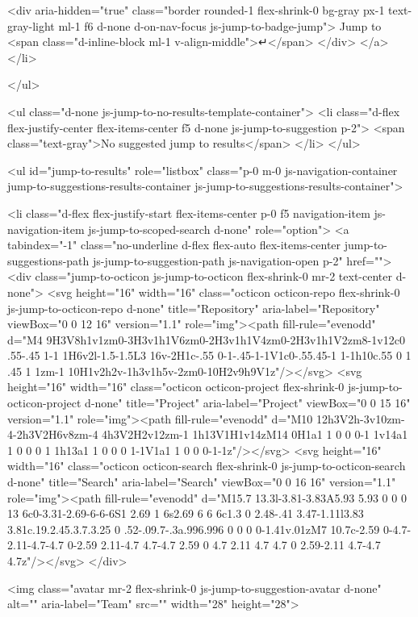     <div aria-hidden="true" class="border rounded-1 flex-shrink-0 bg-gray px-1 text-gray-light ml-1 f6 d-none d-on-nav-focus js-jump-to-badge-jump">
      Jump to
      <span class="d-inline-block ml-1 v-align-middle">↵</span>
    </div>
  </a>
</li>

</ul>

<ul class="d-none js-jump-to-no-results-template-container">
  <li class="d-flex flex-justify-center flex-items-center f5 d-none js-jump-to-suggestion p-2">
    <span class="text-gray">No suggested jump to results</span>
  </li>
</ul>

<ul id="jump-to-results" role="listbox" class="p-0 m-0 js-navigation-container jump-to-suggestions-results-container js-jump-to-suggestions-results-container">
  

<li class="d-flex flex-justify-start flex-items-center p-0 f5 navigation-item js-navigation-item js-jump-to-scoped-search d-none" role="option">
  <a tabindex="-1" class="no-underline d-flex flex-auto flex-items-center jump-to-suggestions-path js-jump-to-suggestion-path js-navigation-open p-2" href="">
    <div class="jump-to-octicon js-jump-to-octicon flex-shrink-0 mr-2 text-center d-none">
      <svg height="16" width="16" class="octicon octicon-repo flex-shrink-0 js-jump-to-octicon-repo d-none" title="Repository" aria-label="Repository" viewBox="0 0 12 16" version="1.1" role="img"><path fill-rule="evenodd" d="M4 9H3V8h1v1zm0-3H3v1h1V6zm0-2H3v1h1V4zm0-2H3v1h1V2zm8-1v12c0 .55-.45 1-1 1H6v2l-1.5-1.5L3 16v-2H1c-.55 0-1-.45-1-1V1c0-.55.45-1 1-1h10c.55 0 1 .45 1 1zm-1 10H1v2h2v-1h3v1h5v-2zm0-10H2v9h9V1z"/></svg>
      <svg height="16" width="16" class="octicon octicon-project flex-shrink-0 js-jump-to-octicon-project d-none" title="Project" aria-label="Project" viewBox="0 0 15 16" version="1.1" role="img"><path fill-rule="evenodd" d="M10 12h3V2h-3v10zm-4-2h3V2H6v8zm-4 4h3V2H2v12zm-1 1h13V1H1v14zM14 0H1a1 1 0 0 0-1 1v14a1 1 0 0 0 1 1h13a1 1 0 0 0 1-1V1a1 1 0 0 0-1-1z"/></svg>
      <svg height="16" width="16" class="octicon octicon-search flex-shrink-0 js-jump-to-octicon-search d-none" title="Search" aria-label="Search" viewBox="0 0 16 16" version="1.1" role="img"><path fill-rule="evenodd" d="M15.7 13.3l-3.81-3.83A5.93 5.93 0 0 0 13 6c0-3.31-2.69-6-6-6S1 2.69 1 6s2.69 6 6 6c1.3 0 2.48-.41 3.47-1.11l3.83 3.81c.19.2.45.3.7.3.25 0 .52-.09.7-.3a.996.996 0 0 0 0-1.41v.01zM7 10.7c-2.59 0-4.7-2.11-4.7-4.7 0-2.59 2.11-4.7 4.7-4.7 2.59 0 4.7 2.11 4.7 4.7 0 2.59-2.11 4.7-4.7 4.7z"/></svg>
    </div>

    <img class="avatar mr-2 flex-shrink-0 js-jump-to-suggestion-avatar d-none" alt="" aria-label="Team" src="" width="28" height="28">


